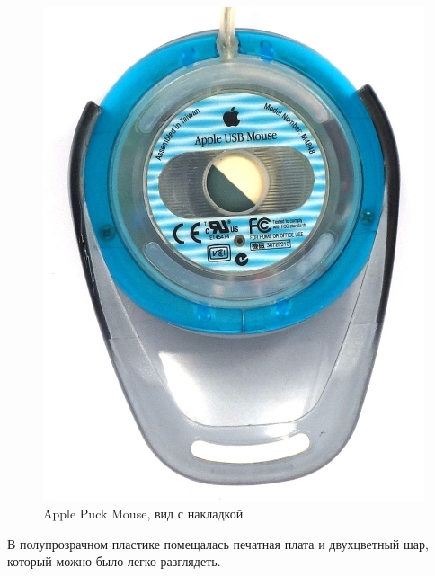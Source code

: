 \documentclass[11pt, a4paper]{article}
\begin{document}
\begin{figure}[h]
    \includegraphics[scale=0.6]{1998_apple_puck/appledown63.JPG}
    \caption{Apple Puck Mouse, вид с накладкой}
    \label{fig:addon}
\end{figure}



В полупрозрачном пластике помещалась печатная плата и двухцветный шар, который можно было легко разглядеть. 
\end{document}
